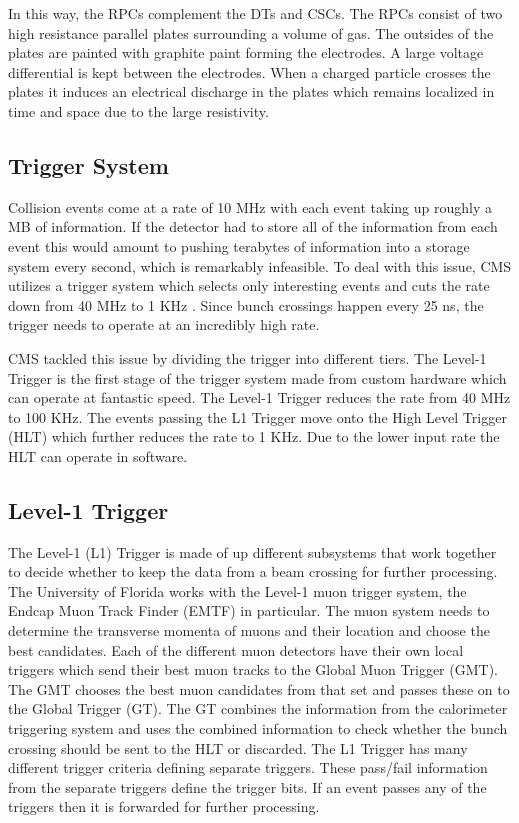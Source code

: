 In this way, the RPCs complement the DTs and CSCs. The RPCs consist of two high resistance parallel plates surrounding a volume of gas. The outsides of the plates are painted with graphite paint forming the electrodes. A large voltage differential is kept between the electrodes. When a charged particle crosses the plates it induces an electrical discharge in the plates which remains localized in time and space due to the large resistivity.

\subsection{Trigger System}
Collision events come at a rate of 10 MHz with each event taking up roughly a MB of information. If the detector had to store all of the information from each event this would amount to pushing terabytes of information into a storage system every second, which is remarkably infeasible. To deal with this issue, CMS utilizes a trigger system which selects only interesting events and cuts the rate down from 40 MHz to 1 KHz \cite{cmsexp}. Since bunch crossings happen every 25 ns, the trigger needs to operate at an incredibly high rate.

CMS tackled this issue by dividing the trigger into different tiers. The Level-1 Trigger is the first stage of the trigger system made from custom hardware which can operate at fantastic speed. The Level-1 Trigger reduces the rate from 40 MHz to 100 KHz. The events passing the L1 Trigger move onto the High Level Trigger (HLT) which further reduces the rate to 1 KHz. Due to the lower input rate the HLT can operate in software.

\subsection{Level-1 Trigger}

The Level-1 (L1) Trigger is made of up different subsystems that work together to decide whether to keep the data from a beam crossing for further processing. The University of Florida works with the Level-1 muon trigger system, the Endcap Muon Track Finder (EMTF) in particular. The muon system needs to determine the transverse momenta of muons and their location and choose the best candidates. Each of the different muon detectors have their own local triggers which send their best muon tracks to the Global Muon Trigger (GMT). The GMT chooses the best muon candidates from that set and passes these on to the Global Trigger (GT). The GT combines the information from the calorimeter triggering system and uses the combined information to check whether the bunch crossing should be sent to the HLT or discarded. The L1 Trigger has many different trigger criteria defining separate triggers. These pass/fail information from the separate triggers define the trigger bits. If an event passes any of the triggers then it is forwarded for further processing.

